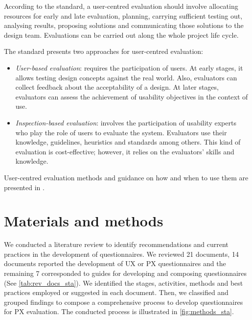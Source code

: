 According to the standard, a user-centred evaluation should involve allocating resources for early and late evaluation, planning, carrying sufficient testing out, analysing results, proposing solutions and communicating those solutions to the design team. Evaluations can be carried out along the whole project life cycle.

The standard presents two approaches for user-centred evaluation: 

\begin{itemize}
    \item \emph{User-based evaluation}: requires the participation of users. At early stages, it allows testing design concepts against the real world. Also, evaluators can collect feedback about the acceptability of a design.
    At later stages, evaluators can assess the achievement of usability objectives in the context of use.
    \item \emph{Inspection-based evaluation}: involves the participation of usability experts who play the role of users to evaluate the system. Evaluators use their knowledge, guidelines, heuristics and standards among others. This kind of evaluation is cost-effective; however, it relies on the evaluators' skills and knowledge.
\end{itemize}

User-centred evaluation methods and guidance on how and when to use them are presented in \autocite{iso16982}.

\section{Materials and methods} %
\label{sec:mats_mets_sta}

We conducted a literature review to identify recommendations and current practices in the development of questionnaires. We reviewed 21 documents, 14 documents reported the development of \ac{UX} or \ac{PX} questionnaires and the remaining 7 corresponded to guides for developing and composing questionnaires (See \autoref{tab:rev_docs_sta}). We identified the stages, activities, methods and best practices employed or suggested in each document. Then, we classified and grouped findings to compose a comprehensive process to develop questionnaires for \ac{PX} evaluation. The conducted process is illustrated in \autoref{fig:methods_sta}.

